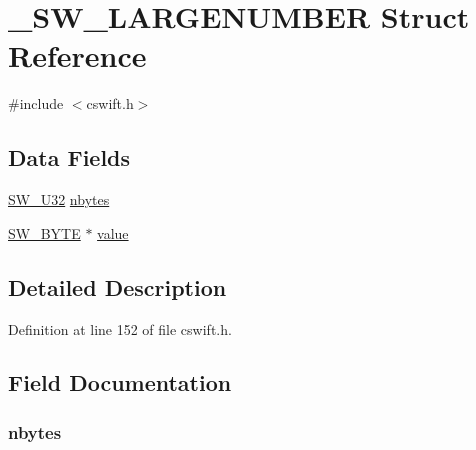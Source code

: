 \hypertarget{struct___s_w___l_a_r_g_e_n_u_m_b_e_r}{}\section{\+\_\+\+S\+W\+\_\+\+L\+A\+R\+G\+E\+N\+U\+M\+B\+ER Struct Reference}
\label{struct___s_w___l_a_r_g_e_n_u_m_b_e_r}


{\ttfamily \#include $<$cswift.\+h$>$}

\subsection*{Data Fields}
\begin{DoxyCompactItemize}
\item 
\hyperlink{cswift_8h_a1ddf1d5a0d87795e81e41be673cbabeb}{S\+W\+\_\+\+U32} \hyperlink{struct___s_w___l_a_r_g_e_n_u_m_b_e_r_abd7b92e25841cbeb497eda985d60162d}{nbytes}
\item 
\hyperlink{cswift_8h_ab7979745c365250458d6e0750e64b25b}{S\+W\+\_\+\+B\+Y\+TE} $\ast$ \hyperlink{struct___s_w___l_a_r_g_e_n_u_m_b_e_r_af0e96cb5b025e781ddb9cac2cb052dc0}{value}
\end{DoxyCompactItemize}


\subsection{Detailed Description}


Definition at line 152 of file cswift.\+h.



\subsection{Field Documentation}
\subsubsection[{\texorpdfstring{nbytes}{nbytes}}]{ nbytes}\hypertarget{struct___s_w___l_a_r_g_e_n_u_m_b_e_r_abd7b92e25841cbeb497eda985d60162d}{}\label{struct___s_w___l_a_r_g_e_n_u_m_b_e_r_abd7b92e25841cbeb497eda985d60162d}


